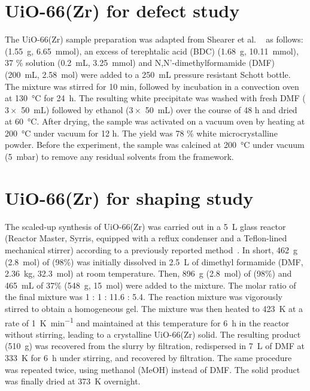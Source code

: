 \section{UiO-66(Zr) for defect study}%
\label{appx:synthesis:uio66def}

The UiO-66(Zr) sample preparation was adapted from Shearer et al.
~\cite{shearerTunedPerfectionIroning2014} as follows:
 (\SI{1.55}{\gram}, \SI{6.65}{\milli\mol}), an excess 
of terephtalic acid (BDC)
(\SI{1.68}{\gram}, \SI{10.11}{\milli\mol}),  37 \% solution 
(\SI{0.2}{\milli\liter}, \SI{3.25}{\milli\mol}) and N,N’-dimethylformamide
(DMF) (\SI{200}{\milli\liter}, \SI{2.58}{\mol}) were added to a 
\SI{250}{\milli\liter} pressure resistant Schott bottle. The mixture 
was stirred for 10 min, followed by incubation in a convection oven 
at \SI{130}{\celsius} for \SI{24}{\hour}. The resulting white 
precipitate was washed with fresh DMF (\(3 \times \) \SI{50}{\milli\liter}) 
followed by ethanol (\(3 \times \) \SI{50}{\milli\liter})
over the course of 48 h and dried at \SI{60}{\celsius}. 
After drying, the sample was activated 
on a vacuum oven by heating at \SI{200}{\celsius} under vacuum for 12 h. 
The yield was 78 \% white microcrystalline powder. Before the 
experiment, the sample was calcined at \SI{200}{\celsius} under
vacuum (\SI{5}{\milli\bar}) to remove any residual solvents
from the framework.

\section{UiO-66(Zr) for shaping study}%
\label{appx:synthesis:uio66shaping}

The scaled-up synthesis of UiO-66(Zr) was carried out in 
a \SI{5}{\liter} glass reactor (Reactor Master, Syrris, equipped with 
a reflux condenser and a Teflon-lined mechanical stirrer)
according to a previously reported 
method~\cite{ragonSituEnergyDispersiveXray2014}.
In short, \SI{462}{\gram} (\SI{2.8}{\mol}) of  (98\%) was 
initially dissolved in \SI{2.5}{\liter} of dimethyl formamide (DMF, 
\SI{2.36}{\kilo\gram}, \SI{32.3}{\mol}) at room temperature. 
Then, \SI{896}{\gram} (\SI{2.8}{\mol}) of 
(98\%) and \SI{465}{\milli\liter} of 37\%  
(\SI{548}{\gram}, \SI{15}{\mol}) were added to the mixture. 
The molar ratio of the final  
mixture was 1 : 1 : 11.6 : 5.4. The reaction mixture was vigorously
stirred to obtain a homogeneous gel. The mixture was then heated
to \SI{423}{\kelvin} at a rate of \SI{1}{\kelvin\per\minute}
and maintained at this temperature for \SI{6}{\hour} in the
reactor without stirring, leading to a crystalline UiO-66(Zr) solid.
The resulting product (\SI{510}{\gram}) was recovered from the 
slurry by filtration, redispersed in \SI{7}{\liter} of DMF at 
\SI{333}{\kelvin} for \SI{6}{\hour} under stirring, 
and recovered by filtration. 
The same procedure was repeated twice, using methanol (MeOH) 
instead of DMF. The solid product was finally dried at 
\SI{373}{\kelvin} overnight.

